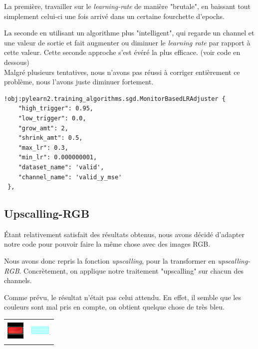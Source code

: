 \documentclass[12pt, a4paper]{article}
\begin{document}
La première, travailler sur le \emph{learning-rate} de manière "brutale", en baissant tout simplement celui-ci une fois arrivé dans un certaine fourchette d'epochs. 

La seconde en utilisant un algorithme plus "intelligent", qui regarde un channel et une valeur de sortie et fait augmenter ou diminuer le \emph{learning rate} par rapport à cette valeur. Cette seconde approche s'est évéré la plus efficace. (voir code en dessous)
\\

Malgré plusieurs tentatives, nous n'avons pas réussi à corriger entièrement ce problème, nous l'avons juste diminuer fortement.

\begin{verbatim}
!obj:pylearn2.training_algorithms.sgd.MonitorBasedLRAdjuster {
    "high_trigger": 0.95,
    "low_trigger": 0.0,
    "grow_amt": 2,
    "shrink_amt": 0.5,
    "max_lr": 0.3,
    "min_lr": 0.000000001,
    "dataset_name": 'valid',
    "channel_name": 'valid_y_mse'
 },
\end{verbatim}
	
	\subsection{Upscalling-RGB}
Étant relativement satisfait des résultats obtenus, nous avons décidé d'adapter notre code pour pouvoir faire la même chose avec des images RGB. 

Nous avons donc repris la fonction \emph{upscalling}, pour la transformer en \emph{upscalling-RGB}. Concrètement, on applique notre traitement "upscalling" sur chacun des channels. 

Comme prévu, le résultat n'était pas celui attendu. En effet, il semble que les couleurs sont mal pris en compte, on obtient quelque chose de très bleu. 

\begin{center}
\begin{tabular}{cc}
   \includegraphics[scale=2]{Images/rectangleR_original.png} &
   \includegraphics[scale=2]
   {Images/rectangleR_reconstruction.png} \\
\end{tabular}
\end{center}
\end{document}
